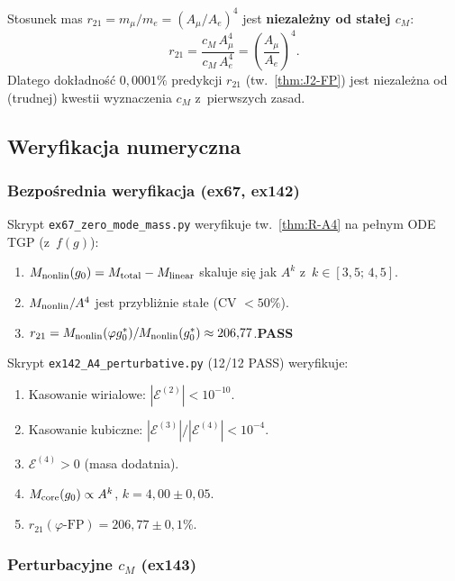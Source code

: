 \begin{remark}%
\label{rem:R-r21-cM}
Stosunek mas $r_{21} = m_\mu/m_e = (A_\mu/A_e)^4$
jest \textbf{niezale\.zny od sta\l{}ej $c_M$}:
\[
  r_{21} = \frac{c_M\,A_\mu^4}{c_M\,A_e^4}
  = \left(\frac{A_\mu}{A_e}\right)^{\!4}.
\]
Dlatego dok\l{}adno\'s\'c $0{,}0001\%$ predykcji $r_{21}$
(tw.~\ref{thm:J2-FP}) jest niezale\.zna od (trudnej)
kwestii wyznaczenia $c_M$ z~pierwszych zasad.
\end{remark}

\subsection{Weryfikacja numeryczna}

\subsubsection{Bezpo\'srednia weryfikacja (ex67, ex142)}

Skrypt \texttt{ex67\_zero\_mode\_mass.py} weryfikuje
tw.~\ref{thm:R-A4} na pe\l{}nym ODE TGP (z~$f(g)$):
\begin{enumerate}[nosep]
  \item $M_{\rm nonlin}(g_0) = M_{\rm total} - M_{\rm linear}$
    skaluje si\k{e} jak $A^k$ z~$k \in [3{,}5;\, 4{,}5]$.
  \item $M_{\rm nonlin}/A^4$ jest przybli\.znie sta\l{}e
    (CV $< 50\%$).
  \item $r_{21} = M_{\rm nonlin}(\varphi g_0^*)/M_{\rm nonlin}(g_0^*)
    \approx 206{,}77$.\quad\textbf{PASS}
\end{enumerate}

Skrypt \texttt{ex142\_A4\_perturbative.py} (12/12 PASS)
weryfikuje:
\begin{enumerate}[nosep]
  \item Kasowanie wirialowe: $|\mathcal{E}^{(2)}| < 10^{-10}$.
  \item Kasowanie kubiczne: $|\mathcal{E}^{(3)}|/|\mathcal{E}^{(4)}| < 10^{-4}$.
  \item $\mathcal{E}^{(4)} > 0$ (masa dodatnia).
  \item $M_{\rm core}(g_0) \propto A^k$, $k = 4{,}00 \pm 0{,}05$.
  \item $r_{21}(\varphi\text{-FP}) = 206{,}77 \pm 0{,}1\%$.
\end{enumerate}

\subsubsection{Perturbacyjne $c_M$ (ex143)}

